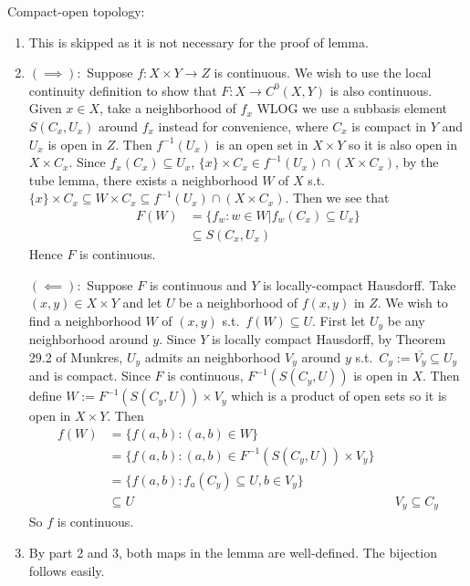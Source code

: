 \documentclass[12pt]{article}
\begin{document}
\begin{problem}[4]
Compact-open topology:
\begin{enumerate}[label=(\arabic*)]
	\item This is skipped as it is not necessary for the proof of lemma.

	\item 

	$ (\implies):$ Suppose $ f: X \times Y \to Z$ is continuous. We wish to use the local continuity definition to show that $ F:X \to C^{0}(X,Y)$ is also continuous. Given $ x \in X$, take a neighborhood of $ f_x$ WLOG we use a subbasis element $ S(C_x,U_x)$ around $ f_x$ instead for convenience, where $ C_x$ is compact in  $ Y$ and  $ U_x$ is open in  $ Z$. Then $ f^{-1}(U_x)$ is an open set in $ X \times Y$ so it is also open in $ X \times C_x$. Since $ f_x(C_x) \subseteq U_x$, $ \{x\} \times C_x \in f^{-1}(U_x) \cap (X \times C_x)$, by the tube lemma, there exists a neighborhood $ W$ of  $ X$  s.t.\ $ \{x\} \times C_x \subseteq W \times C_x \subseteq f^{-1}(U_x) \cap (X \times C_x) $. Then we see that
	\begin{align*}
		F(W) &= \{f_w: w \in W| f_w(C_x) \subseteq U_x\}  \\
		& \subseteq S(C_x,U_x)   
	\end{align*}
	Hence $ F$ is continuous.

	$ (\impliedby):$ Suppose $ F$ is continuous and $ Y$ is locally-compact Hausdorff. Take  $ (x,y) \in X \times Y$ and let $ U$ be a neighborhood of  $ f(x,y)$ in  $ Z$. We wish to find a neighborhood $ W$ of  $ (x,y)$ s.t.\ $ f(W) \subseteq U$. First let $ U_y$ be any neighborhood around $ y$. Since  $ Y$ is locally compact Hausdorff, by Theorem 29.2 of Munkres, $ U_y$ admits an neighborhood  $ V_y$ around  $ y$  s.t.\ $C_y := \overline{V_y} \subseteq U_y$ and is compact. Since $ F$ is continuous,  $ F^{-1}(S(C_y,U))$ is open in $ X$. Then define $ W:= F^{-1}(S(C_y,U)) \times V_y $ which is a product of open sets so it is open in $ X \times Y$. Then
	\begin{align*}
		f(W) &= \{f(a,b) : (a,b) \in W\}  \\
		&= \{f(a,b): (a,b) \in F^{-1}(S(C_y,U)) \times V_y \}  \\
		&= \{f(a,b):f_a(C_y) \subseteq U, b \in V_y\}  \\
		&\subseteq U && V_y \subseteq C_y
	\end{align*}
	So $ f$ is continuous.
\item By part 2 and 3, both maps in the lemma are well-defined. The bijection follows easily.
\end{enumerate}
\end{problem}
\end{document}
